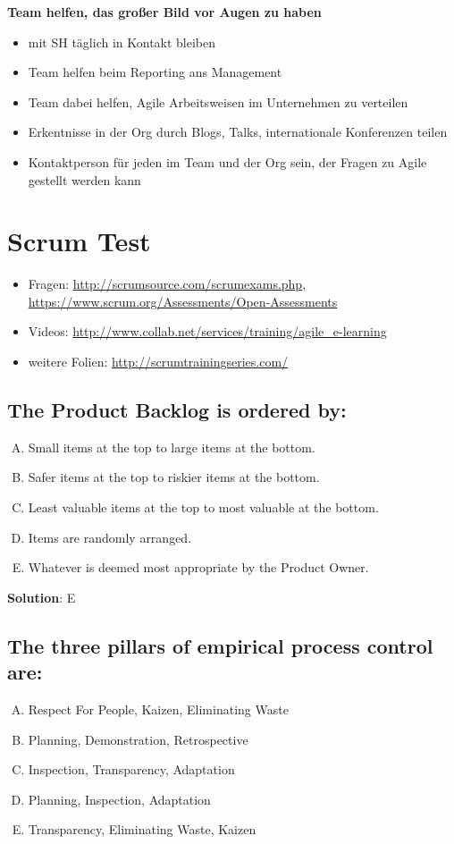 \textbf{Team helfen, das großer Bild vor Augen zu haben}

\begin{itemize}
  \item mit SH täglich in Kontakt bleiben
  \item Team helfen beim Reporting ans Management
  \item Team dabei helfen, Agile Arbeitsweisen im Unternehmen zu verteilen
  \item Erkentnisse in der Org durch Blogs, Talks, internationale Konferenzen teilen
  \item Kontaktperson für jeden im Team und der Org sein, der Fragen zu Agile gestellt werden kann
\end{itemize}

\pagebreak

\section{Scrum Test}

\begin{itemize}
  \item Fragen: \url{http://scrumsource.com/scrumexams.php}, \url{https://www.scrum.org/Assessments/Open-Assessments}
  \item Videos: \url{http://www.collab.net/services/training/agile_e-learning}
  \item weitere Folien: \url{http://scrumtrainingseries.com/}
\end{itemize}


\subsection{The Product Backlog is ordered by:}
\begin{enumerate}[A)]
  \item Small items at the top to large items at the bottom.
  \item Safer items at the top to riskier items at the bottom.
  \item Least valuable items at the top to most valuable at the bottom.
  \item Items are randomly arranged.
  \item Whatever is deemed most appropriate by the Product Owner.
\end{enumerate}


\textbf{Solution}: E


\subsection{The three pillars of empirical process control are:}
\begin{enumerate}[A)]
  \item Respect For People, Kaizen, Eliminating Waste
  \item Planning, Demonstration, Retrospective
  \item Inspection, Transparency, Adaptation
  \item Planning, Inspection, Adaptation
  \item Transparency, Eliminating Waste, Kaizen
\end{enumerate}


